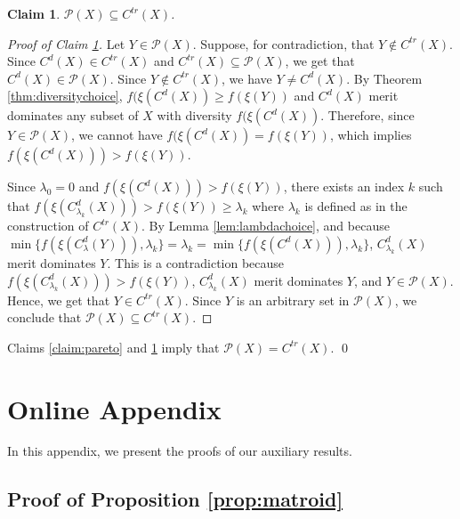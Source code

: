 \documentclass[12pt]{amsart}
\newtheorem{claim}{Claim}
\theoremstyle{remark}
\begin{document}
\begin{claim}\label{claim:trace}
$\mathcal{P}(X) \subseteq C^{tr}(X)$.
\end{claim}

\begin{proof}[Proof of Claim \ref{claim:trace}]\renewcommand{\qedsymbol}{$\blacksquare$}
Let $Y\in \mathcal{P}(X)$. Suppose, for contradiction, that $Y\notin C^{tr}(X)$.
Since $C^d(X)\in C^{tr}(X)$ and $C^{tr}(X)\subseteq \mathcal{P}(X)$, we get that
$C^d(X)\in \mathcal{P}(X)$. Since $Y\notin C^{tr}(X)$, we have $Y\neq C^d(X)$.
By Theorem \ref{thm:diversitychoice}, $f(\xi(C^d(X))\geq f(\xi(Y))$
and $C^d(X)$ merit dominates any subset of $X$ with diversity $f(\xi(C^d(X))$.
Therefore, since $Y \in \mathcal{P}(X)$, we cannot have $f(\xi(C^d(X)) = f(\xi(Y))$,
which implies $f(\xi(C^d(X))) > f(\xi(Y))$.

Since $\lambda_0=0$ and $f(\xi(C^d(X))) > f(\xi(Y))$, there exists an
index $k$ such that $f(\xi(C^d_{\lambda_k}(X))) > f(\xi(Y)) \geq \lambda_k$ where
$\lambda_k$ is defined as in the construction of $C^{tr}(X)$. By Lemma
\ref{lem:lambdachoice}, and because $\min\{f(\xi(C^d_{\lambda}(Y))),\lambda_k\}=\lambda_k=\min\{f(\xi(C^d(X))),\lambda_k\}$,
$C^d_{\lambda_k}(X)$ merit dominates $Y$. This is a contradiction because
$f(\xi(C^d_{\lambda_k}(X))) > f(\xi(Y))$, $C^d_{\lambda_k}(X)$ merit dominates $Y$,
and $Y\in \mathcal{P}(X)$. Hence, we get that $Y\in C^{tr}(X)$. Since $Y$
is an arbitrary set in $\mathcal{P}(X)$, we conclude that $\mathcal{P}(X) \subseteq C^{tr}(X)$.
\end{proof}
Claims \ref{claim:pareto} and \ref{claim:trace} imply that $\mathcal{P}(X) = C^{tr}(X)$.
\qed








\newpage

\section*{Online Appendix}
In this appendix, we present the proofs of our auxiliary results.


\subsection*{Proof of Proposition \ref{prop:matroid}}
\end{document}
